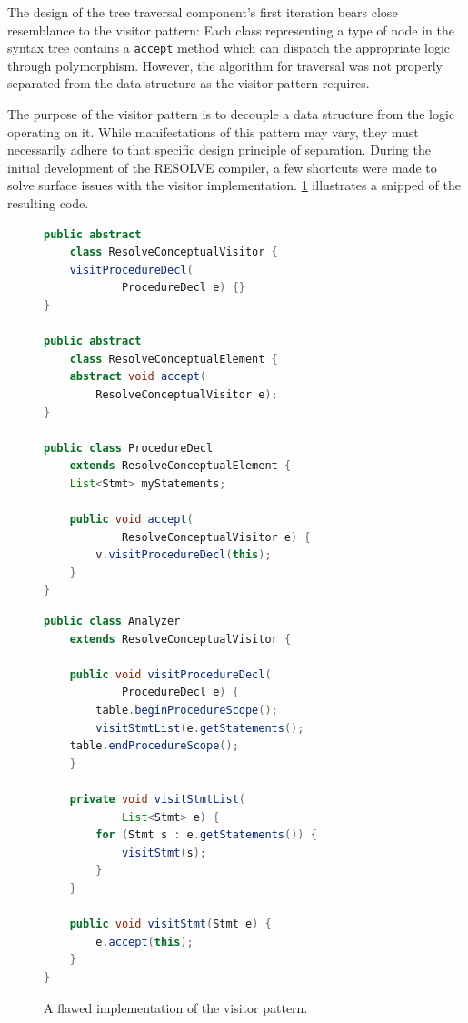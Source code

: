 \documentclass[times]{speauth}
\begin{document}
The design of the tree traversal component's first iteration bears close resemblance to the visitor pattern: Each class representing a type of node in the syntax tree contains a \texttt{accept} method which can dispatch the appropriate logic through polymorphism. However, the algorithm for traversal was not properly separated from the data structure as the visitor pattern requires.

The purpose of the visitor pattern is to decouple a data structure from the logic operating on it. While manifestations of this pattern may vary, they must necessarily adhere to that specific design principle of separation. During the initial development of the RESOLVE compiler, a few shortcuts were made to solve surface issues with the visitor implementation. \ref{fig:flawedvisitorexample} illustrates a snipped of the resulting code.

\begin{figure}
\centering
\begin{minipage}{.45\textwidth}
\begin{lstlisting}[language=java]
public abstract
	class ResolveConceptualVisitor {
    visitProcedureDecl(
    		ProcedureDecl e) {}
}

public abstract 
	class ResolveConceptualElement {
    abstract void accept(
        ResolveConceptualVisitor e);
}

public class ProcedureDecl
	extends ResolveConceptualElement {	
    List<Stmt> myStatements;
    
    public void accept(
    		ResolveConceptualVisitor e) {
        v.visitProcedureDecl(this);
    }
}
\end{lstlisting}
\end{minipage}\quad
\begin{minipage}{.45\textwidth}
\begin{lstlisting}[language=java]
public class Analyzer
	extends ResolveConceptualVisitor {
	
    public void visitProcedureDecl(
  			ProcedureDecl e) {
        table.beginProcedureScope();
        visitStmtList(e.getStatements();
	table.endProcedureScope();
    }
    
    private void visitStmtList(
    		List<Stmt> e) {
        for (Stmt s : e.getStatements()) {
            visitStmt(s);
        }
    }
    
    public void visitStmt(Stmt e) {
        e.accept(this);
    }
}
\end{lstlisting}
\end{minipage}
\caption{A flawed implementation of the visitor pattern.}
\label{fig:flawedvisitorexample}
\end{figure}
\end{document}
